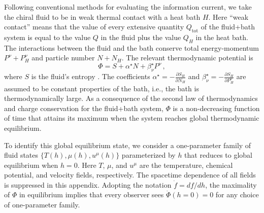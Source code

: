\documentclass[a4paper, amsfonts, amssymb, amsmath, reprint, showkeys, nofootinbib, twoside,notitlepage,onecolumn,preprintnumbers]{revtex4-2}
\theoremstyle{definition}
\theoremstyle{theorem}
\theoremstyle{corollary}
\begin{document}
Following conventional methods \cite{GavassinoGibbs2021,GavassinoGENERIC2022} for evaluating the information current, we take the chiral fluid to be in weak thermal contact with a heat bath $H$. Here ``weak contact'' means that the value of every extensive quantity $Q_\text{tot}$ of the fluid+bath system is equal to the value $Q$ in the fluid plus the value $Q_H$ in the heat bath. The interactions between the fluid and the bath conserve total energy-momentum $P^\nu + P^\nu_H$ and particle number $N + N_H$. The relevant thermodynamic potential is
\begin{equation} \label{chir-potential}
    \Phi = S + \alpha^\star N + \beta^\star_\nu P^\nu\, ,
\end{equation}
where $S$ is the fluid's entropy \cite{GavassinoTermometri2020}. The coefficients $\alpha^\star=-\frac{\partial S_H}{\partial N_H}$ and $\beta^\star_\nu = - \frac{\partial S_H}{\partial P^\nu_H}$ are assumed to be constant properties of the bath, i.e., the bath is thermodynamically large. As a consequence of the second law of thermodynamics and charge conservation for the fluid+bath system, $\Phi$ is a non-decreasing function of time that attains its maximum when the system reaches global thermodynamic equilibrium.

To identify this global equilibrium state, we consider a one-parameter family of fluid states $\{T(h), \mu(h), u^\mu(h)\}$ parameterized by $h$ that reduces to global equilibrium when $h=0$. Here $T$, $\mu$, and $u^\mu$ are the temperature, chemical potential, and velocity fields, respectively. The spacetime dependence of all fields is suppressed in this appendix. Adopting the notation $\dot f = df/dh$, the maximality of $\Phi$ in equilibrium implies that every observer sees $\dot \Phi(h=0)=0$ for any choice of one-parameter family.
\end{document}
